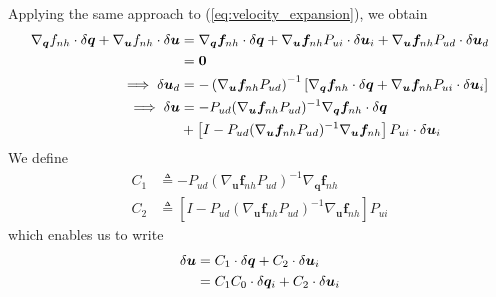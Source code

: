 \documentclass{svjour3}                     %
\begin{document}
Applying the same approach to (\ref{eq:velocity_expansion}), we obtain
\begin{align}
\nabla_{\bm{q}}f_{nh} \cdot \delta \bm{q} +
\nabla_{\bm{u}}f_{nh} \cdot \delta \bm{u} &= \nabla_{\bm{q}} \bm{f}_{nh} \cdot
\delta \bm{q} + \nabla_{\bm{u}} \bm{f}_{nh} P_{ui} \cdot \delta \bm{u}_i +
\nabla_{\bm{u}} \bm{f}_{nh} P_{ud} \cdot \delta \bm{u}_d \notag\\
&= \bm{0}\notag\\
\implies \delta \bm{u}_d &= -\left(\nabla_{\bm{u}} \bm{f}_{nh}
P_{ud}\right)^{-1}\left[\nabla_{\bm{q}}\bm{f}_{nh} \cdot \delta\bm{q} +
  \nabla_{\bm{u}} \bm{f}_{nh} P_{ui} \cdot \delta \bm{u}_i \right]\notag\\
  \implies \delta \bm{u} &= -P_{ud}(\nabla_{\bm{u}} \bm{f}_{nh} P_{ud})^{-1}
  \nabla_{\bm{q}} \bm{f}_{nh} \cdot \delta \bm{q}\notag\\
  &+ \left[I - P_{ud} (\nabla_{\bm{u}}\bm{f}_{nh} P_{ud})^{-1} \nabla_{\bm{u}}
    \bm{f}_{nh} \right] P_{ui} \cdot \delta \bm{u}_i
\end{align}
We define
\begin{align}
  \label{eq:C_1}
  C_1 &\triangleq -P_{ud}(\nabla_{\bm{u}} \bm{f}_{nh} P_{ud})^{-1}
  \nabla_{\bm{q}} \bm{f}_{nh} \\
  \label{eq:C_2}
  C_2 &\triangleq \left[I - P_{ud} (\nabla_{\bm{u}}\bm{f}_{nh} P_{ud})^{-1} \nabla_{\bm{u}}
    \bm{f}_{nh} \right] P_{ui}
\end{align}
which enables us to write
\begin{align}
  \label{eq:delta_u}
  \delta \bm{u} &= C_1 \cdot \delta \bm{q} + C_2 \cdot \delta \bm{u}_i\notag\\
  &= C_1 C_0 \cdot \delta \bm{q}_i + C_2 \cdot \delta \bm{u}_i
\end{align}
\end{document}
